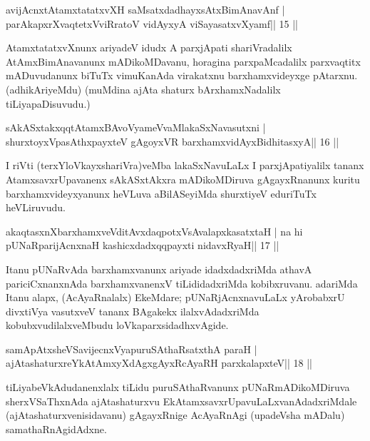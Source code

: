 \begin{shl}
avijAcnxtAtamxtatatxvXH saMsatxdadhayxsAtxBimAnavAnf |
parAkapxrXvaqtetxVviRratoV vidAyxyA viSayasatxvXyamf\hfill || 15 ||
\end{shl}

\begin{artha}
AtamxtatatxvXnunx ariyadeV idudx A parxjApati shariVradalilx 
AtAmxBimAnavanunx mADikoMDavanu, horagina parxpaMcadalilx parxvaqtitx 
mADuvudanunx biTuTx vimuKanAda virakatxnu barxhamxvideyxge pAtarxnu. 
(adhikAriyeMdu) (muMdina ajAta shaturx bArxhamxNadalilx 
tiLiyapaDisuvudu.)
\end{artha}

\begin{shl}
sAkASxtakxqqtAtamxBAvoV\s yameVvaMlakaSxNavasutxni |
shurxtoyxVpasAthxpayxteV gAgoyxVR barxhamxvidAyxBidhitasxyA\hfill || 16 ||
\end{shl}

\begin{artha}
I riVti (terxYloVkayxshariVra)veMba lakaSxNavuLaLx I parxjApatiyalilx 
tananx AtamxsavxrUpavanenx sAkASxtAkxra mADikoMDiruva gAgayxRnanunx kuritu barxhamxvideyxyanunx heVLuva aBilASeyiMda shurxtiyeV eduriTuTx heVLiruvudu.
\end{artha} 


\begin{shl}
akaqtasxnXbarxhamxveVditAvxdaqpotxV\s sAvalapxkasatxtaH |
na hi pUNaRparijAcnxnaH kashicxdadxqqpayxti nidavxRyaH\hfill || 17 ||
\end{shl}

\begin{artha}
Itanu pUNaRvAda barxhamxvanunx ariyade idadxdadxriMda athavA pariciCxnanxnAda barxhamxvanenxV tiLididadxriMda kobibxruvanu. adariMda Itanu alapx, (AcAyaRnalalx) EkeMdare; pUNaRjAcnxnavuLaLx yArobabxrU divxtiVya vasutxveV tananx BAgakekx ilalxvAdadxriMda kobubxvudilalxveMbudu loVkaparxsidadhxvAgide.
\end{artha}

\begin{shl}
samApAtxsheVSavijecnxVyapuruSAthaRsatxthA paraH |
ajAtashaturxreYkAtAmxyXdAgxgAyxRcAyaRH parxkalapxteV\hfill || 18 ||
\end{shl}

\begin{artha}
tiLiyabeVkAdudanenxlalx tiLidu puruSAthaRvanunx pUNaRmADikoMDiruva sherxVSaThxnAda ajAtashaturxvu EkAtamxsavxrUpavuLaLxvanAdadxriMdale (ajAtashaturxvenisidavanu) gAgayxRnige AcAyaRnAgi (upadeVsha mADalu) samathaRnAgidAdxne.
\end{artha}

